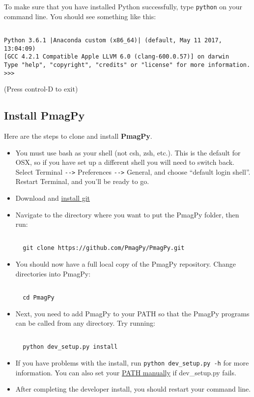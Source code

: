 \documentclass[11pt]{article}
\begin{document}
To make sure that you have installed Python successfully, type \texttt{python} on your command line.  You should see something like this: \begin{verbatim}

Python 3.6.1 |Anaconda custom (x86_64)| (default, May 11 2017, 13:04:09)
[GCC 4.2.1 Compatible Apple LLVM 6.0 (clang-600.0.57)] on darwin
Type "help", "copyright", "credits" or "license" for more information.
>>>\end{verbatim}
(Press control-D to exit)


\subsection{Install PmagPy}

Here are the steps to clone and install {\bf PmagPy}.

\begin{itemize}

  \item You must use bash as your shell (not csh, zsh, etc.). This is the default for OSX, so if you have set up a different shell you will need to switch back.  Select Terminal \verb!-->! Preferences \verb!-->! General, and choose ``default login shell''.  Restart Terminal, and you'll be ready to go.

\item Download and \href{https://git-scm.com/downloads}{install git}

  \item Navigate to the directory where you want to put the PmagPy folder, then run:

\begin{verbatim}

  git clone https://github.com/PmagPy/PmagPy.git
\end{verbatim}

\item You should now have a full local copy of the PmagPy repository.  Change directories into PmagPy:

\begin{verbatim}

  cd PmagPy
\end{verbatim}

\item Next, you need to add PmagPy to your PATH so that the PmagPy programs can be called from any directory. Try running:

\begin{verbatim}

  python dev_setup.py install
\end{verbatim}

\item If you have problems with the install, run \verb!python dev_setup.py -h! for more information.  You can also set your \href{https://earthref.org/PmagPy/cookbook/#setting_path}{PATH manually} if dev\_setup.py fails.

\item After completing the developer install, you should restart your command line.

\end{itemize}
\end{document}
